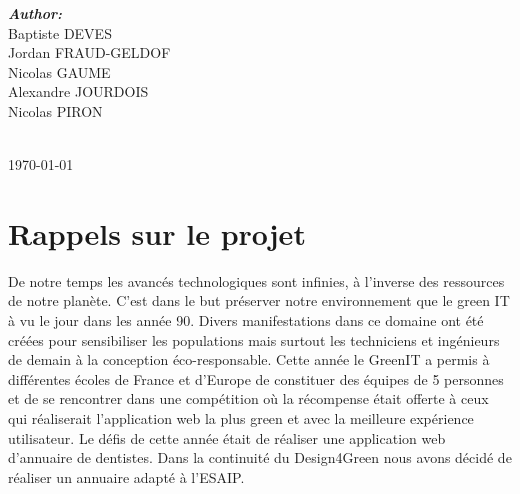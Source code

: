 \documentclass[11pt,a4paper]{report}
\begin{document}
\begin{titlepage}

\begin{minipage}{0.4\textwidth}
\begin{flushleft} \large
\emph{\textbf {Author:}}\\
Baptiste \textsc{DEVES}\\ %
Jordan \textsc{FRAUD-GELDOF}\\
Nicolas \textsc{GAUME}\\
Alexandre \textsc{JOURDOIS}\\
Nicolas \textsc{PIRON}\\
\end{flushleft}

\end{minipage}\\[2cm]



{\large \today}\\[2cm] %

\vfill %

\end{titlepage}
\renewcommand{\contentsname}{Sommaire} 
\tableofcontents

	\chapter{Rappels sur le projet}
		De notre temps les avancés technologiques sont infinies, à l'inverse des ressources de notre planète. C'est dans le but préserver notre environnement que le green IT à vu le jour dans les année 90. Divers manifestations dans ce domaine ont été créées pour sensibiliser les populations mais surtout les techniciens et ingénieurs de demain à la conception éco-responsable. Cette année le GreenIT a permis à différentes écoles de France et d'Europe de constituer des équipes de 5 personnes et de se rencontrer dans une compétition  où la récompense était offerte à ceux qui réaliserait l'application web la plus green et avec la meilleure expérience utilisateur. Le défis de cette année était de réaliser une application web d'annuaire de dentistes. Dans la continuité du Design4Green nous avons décidé de réaliser un annuaire adapté à l'ESAIP.
\end{document}
